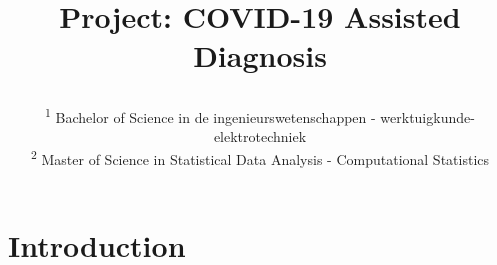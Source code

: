 \documentclass[conference]{IEEEtran}
\begin{document}
\title{Project: COVID-19 Assisted Diagnosis\\


\author{
\and
{}
\and
{}
\and
{}
\and

\textsuperscript{1} Bachelor of Science in de ingenieurswetenschappen - werktuigkunde-elektrotechniek \hfill\\
\textsuperscript{2} Master of Science in Statistical Data Analysis - Computational Statistics\hfill\\}
}
\maketitle



\section{Introduction}
\end{document}
